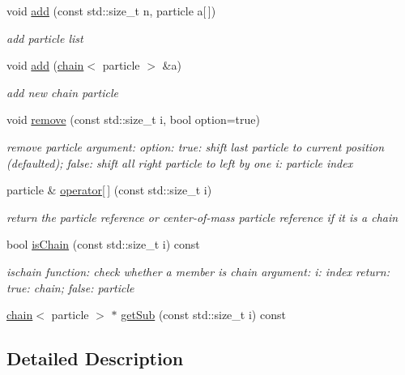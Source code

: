 \begin{DoxyCompactItemize}
void \hyperlink{classchainlist_a7099a6d3ef768761fdcadc796a1aee62}{add} (const std\+::size\+\_\+t n, particle a\mbox{[}$\,$\mbox{]})
\begin{DoxyCompactList}\small\item\em add particle list \end{DoxyCompactList}\item 
void \hyperlink{classchainlist_a7ef6693832504d519150bf5afff71310}{add} (\hyperlink{classchain}{chain}$<$ particle $>$ \&a)
\begin{DoxyCompactList}\small\item\em add new chain particle \end{DoxyCompactList}\item 
void \hyperlink{classchainlist_a528ffec696df61f2895acf7abbf11cbc}{remove} (const std\+::size\+\_\+t i, bool option=true)
\begin{DoxyCompactList}\small\item\em remove particle argument\+: option\+: true\+: shift last particle to current position (defaulted); false\+: shift all right particle to left by one i\+: particle index \end{DoxyCompactList}\item 
particle \& \hyperlink{classchainlist_aa455ef096d73bb70d9b6e2191e2062ce}{operator\mbox{[}$\,$\mbox{]}} (const std\+::size\+\_\+t i)
\begin{DoxyCompactList}\small\item\em return the particle reference or center-\/of-\/mass particle reference if it is a chain \end{DoxyCompactList}\item 
bool \hyperlink{classchainlist_a49171f851e7b8e44bcc5022e1e07e433}{is\+Chain} (const std\+::size\+\_\+t i) const
\begin{DoxyCompactList}\small\item\em ischain function\+: check whether a member is chain argument\+: i\+: index return\+: true\+: chain; false\+: particle \end{DoxyCompactList}\item 
\hyperlink{classchain}{chain}$<$ particle $>$ $\ast$ \hyperlink{classchainlist_a7c4566c5074a6c1f34b2a5ca3166ce99}{get\+Sub} (const std\+::size\+\_\+t i) const
\end{DoxyCompactItemize}


\subsection{Detailed Description}
